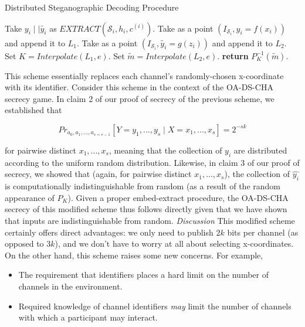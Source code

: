 \documentclass{article}
\begin{document}
\begin{algorithm}[H]
\caption{Distributed Steganographic Decoding Procedure}\label{1a}
\begin{algorithmic}[1]
\State Take $y_i \mid \mid \tilde{y_i}$ as $EXTRACT(\mathcal{S}_i, h_i, c^{(i)})$.
\State Take as a point $(I_{\mathcal{S}_i}, y_i = f(x_i))$ and append it to $L_1$.
\State Take as a point $(I_{\mathcal{S}_i}, \tilde{y_i} = g(z_i))$ and append it to $L_2$.
\EndFor
\State Set $K = Interpolate(L_1,e)$.
\State Set $\tilde{m} = Interpolate(L_2, e)$.
\State \textbf{return} $P_K^{-1}(\tilde{m})$.
\EndProcedure
\end{algorithmic}
\end{algorithm}

\noindent This scheme essentially replaces each channel's randomly-chosen x-coordinate 
with its identifier.  Consider this scheme in the context of the OA-DS-CHA secrecy game.
In claim 2 of our proof of secrecy of the previous scheme, we established that

\[ Pr_{a_0, a_1,...,a_{s=e-1}}[Y = y_1,...,y_s \mid X = x_1,...,x_s] = 2^{-sk} \]

\noindent for pairwise distinct $x_1,...,x_s$, meaning that the collection of $y_i$ are 
distributed according to the uniform random distribution.  Likewise, in claim 3 of our proof of 
secrecy, we showed that (again, for pairwise distinct $x_1,...,x_s$), the collection of 
$\hat{y_i}$ is computationally indistinguishable from random (as a result of the random appearance 
of $P_K$).  Given a proper embed-extract procedure, the OA-DS-CHA secrecy of this modified scheme 
thus follows directly given that we have shown that inputs are indistinguishable from random.
\newline\newline
\noindent \textit{Discussion } This modified scheme certainly offers direct advantages: we only need to publish $2k$ bits 
per channel (as opposed to $3k$), and we don't have to worry at all about selecting x-coordinates.
On the other hand, this scheme raises some new concerns.  For example, 

\begin{itemize}
\item{The requirement that identifiers places a hard limit on the number of channels in the 
environment.}
\item{Required knowledge of channel identifiers \textit{may} limit the number of channels with 
which a participant may interact.}
\end{itemize}
\end{document}
